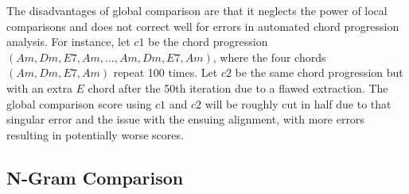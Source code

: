 The disadvantages of global comparison are that it neglects the power of local comparisons and does not correct well for errors in automated chord progression analysis. For instance, let ${c1}$ be the chord progression $(Am, Dm, E7, Am, ... , Am, Dm, E7, Am)$, where the four chords $(Am, Dm, E7, Am)$ repeat 100 times. Let ${c2}$ be the same chord progression but with an extra $E$ chord after the 50th iteration due to a flawed extraction. The global comparison score using ${c1}$ and ${c2}$ will be roughly cut in half due to that singular error and the issue with the ensuing alignment, with more errors resulting in potentially worse scores.

\subsection{N-Gram Comparison}